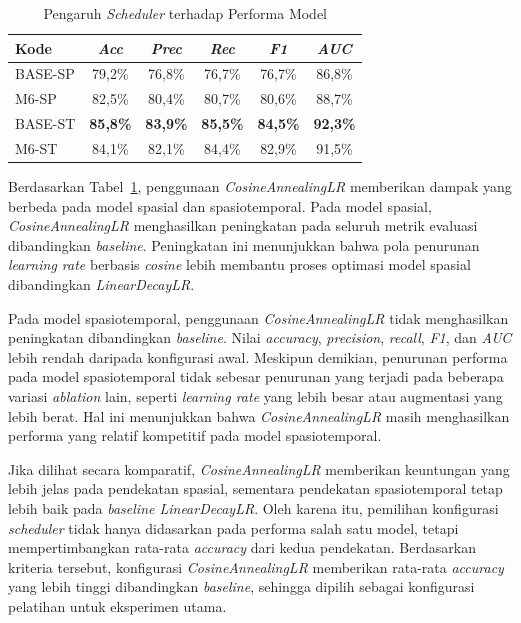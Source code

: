 \begin{table}[htbp]
\centering
\caption{Pengaruh \textit{Scheduler} terhadap Performa Model}
\label{table:4.ablation-scheduler}
\begin{tabular}{lccccc}
\toprule
\textbf{Kode} &
\textbf{\textit{Acc}} &
\textbf{\textit{Prec}} &
\textbf{\textit{Rec}} &
\textbf{\textit{F1}} &
\textbf{\textit{AUC}} \\
\midrule
BASE-SP & 79,2\% & 76,8\% & 76,7\% & 76,7\% & 86,8\% \\
M6-SP & 82,5\% & 80,4\% & 80,7\% & 80,6\% & 88,7\% \\
BASE-ST & \textbf{85,8\%} & \textbf{83,9\%} & \textbf{85,5\%} & \textbf{84,5\%} & \textbf{92,3\%} \\
M6-ST & 84,1\% & 82,1\% & 84,4\% & 82,9\% & 91,5\% \\
\bottomrule
\end{tabular}
\end{table}

Berdasarkan Tabel~\ref{table:4.ablation-scheduler}, penggunaan \textit{CosineAnnealingLR} memberikan dampak yang berbeda pada model spasial dan spasiotemporal. Pada model spasial, \textit{CosineAnnealingLR} menghasilkan peningkatan pada seluruh metrik evaluasi dibandingkan \textit{baseline}. Peningkatan ini menunjukkan bahwa pola penurunan \textit{learning rate} berbasis \textit{cosine} lebih membantu proses optimasi model spasial dibandingkan \textit{LinearDecayLR}.

Pada model spasiotemporal, penggunaan \textit{CosineAnnealingLR} tidak menghasilkan peningkatan dibandingkan \textit{baseline}. Nilai \textit{accuracy}, \textit{precision}, \textit{recall}, \textit{F1}, dan \textit{AUC} lebih rendah daripada konfigurasi awal. Meskipun demikian, penurunan performa pada model spasiotemporal tidak sebesar penurunan yang terjadi pada beberapa variasi \textit{ablation} lain, seperti \textit{learning rate} yang lebih besar atau augmentasi yang lebih berat. Hal ini menunjukkan bahwa \textit{CosineAnnealingLR} masih menghasilkan performa yang relatif kompetitif pada model spasiotemporal.

Jika dilihat secara komparatif, \textit{CosineAnnealingLR} memberikan keuntungan yang lebih jelas pada pendekatan spasial, sementara pendekatan spasiotemporal tetap lebih baik pada \textit{baseline LinearDecayLR}. Oleh karena itu, pemilihan konfigurasi \textit{scheduler} tidak hanya didasarkan pada performa salah satu model, tetapi mempertimbangkan rata-rata \textit{accuracy} dari kedua pendekatan. Berdasarkan kriteria tersebut, konfigurasi \textit{CosineAnnealingLR} memberikan rata-rata \textit{accuracy} yang lebih tinggi dibandingkan \textit{baseline}, sehingga dipilih sebagai konfigurasi pelatihan untuk eksperimen utama.

